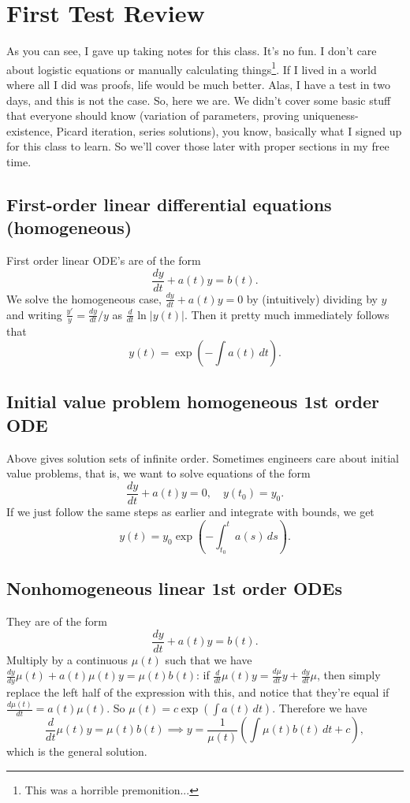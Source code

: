 \section{First Test Review}
As you can see, I gave up taking notes for this class. It's no fun. I don't care about logistic equations or manually calculating things\footnote{This was a horrible premonition...}. If I lived in a world where all I did was proofs, life would be much better. Alas, I have a test in two days, and this is not the case. So, here we are.
\orbreak
We didn't cover some basic stuff that everyone should know (variation of parameters, proving uniqueness-existence, Picard iteration, series solutions), you know, basically what I signed up for this class to learn. So we'll cover those later with proper sections in my free time.

\subsection{First-order linear differential equations (homogeneous)}
First order linear ODE's are of the form 
\begin{equation}
    \frac{dy}{dt}+a(t)y=b(t).
\end{equation}
We solve the homogeneous case, $\frac{dy}{dt}+a(t)y=0$ by (intuitively) dividing by $y$ and writing $\frac{y'}{y}=\frac{dy}{dt}/y$ as $\frac{d}{dt} \ln|y(t)|$. Then it pretty much immediately follows that \[
    y(t)=\exp \left( -\int a(t) \, dt \right) .
\] 

\subsection{Initial value problem homogeneous 1st order ODE}
Above gives solution sets of infinite order. Sometimes engineers care about initial value problems, that is, we want to solve equations of the form 
\begin{equation}
    \frac{dy}{dt}+a(t)y=0,\quad y(t_0)=y_0.
\end{equation}
If we just follow the same steps as earlier and integrate with bounds, we get 
\[
    y(t)=y_0\exp\left( -\int_{t_0}^{t} a(s) \, ds \right) .
\] 

\subsection{Nonhomogeneous linear 1st order ODEs}
They are of the form
\begin{equation}
    \frac{dy}{dt}+a(t)y=b(t).
\end{equation}
Multiply by a continuous $\mu(t)$ such that we have $\frac{dy}{dy}\mu(t)+a(t)\mu(t)y=\mu(t)b(t)$: if $\frac{d}{dt} \mu(t)y=\frac{d\mu}{dt}y+\frac{dy}{dt}\mu$, then simply replace the left half of the expression with this, and notice that they're equal if $ \frac{d\mu(t)}{dt}=a(t)\mu(t)$. So $\mu(t)=c\exp\left( \int a(t) \, dt \right) $. Therefore we have \[
    \frac{d}{dt} \mu(t)y=\mu(t)b(t) \implies y=\frac{1}{\mu(t)}\left( \int \mu(t)b(t) \, dt +c\right),
\] which is the general solution.

